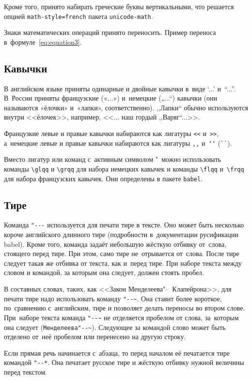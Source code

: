Кроме того, принято набирать греческие буквы вертикальными, что
решается опцией \verb|math-style=french| пакета \verb|unicode-math|.

Знаки математических операций принято переносить. Пример переноса
в~формуле~\eqref{eq:equation3}.

\subsection{Кавычки}
В английском языке приняты одинарные и двойные кавычки в~виде ‘...’ и~“...”.
В~России приняты французские («...») и~немецкие („...“) кавычки (они называются
«ёлочки» и~«лапки», соответственно). ,,Лапки`` обычно используются внутри
<<ёлочек>>, например, <<... наш гордый ,,Варяг``...>>.

Французкие левые и правые кавычки набираются
как лигатуры \verb|<<| и~\verb|>>|, а~немецкие левые
и правые кавычки набираются как лигатуры \verb|,,| и~\verb|‘‘| (\verb|``|).

Вместо лигатур или команд с~активным символом "\ можно использовать команды
\verb|\glqq| и \verb|\grqq| для набора немецких кавычек и команды \verb|\flqq|
и~\verb|\frqq| для набора французских кавычек. Они определены в пакете
\verb|babel|.

\subsection{Тире}
Команда \verb|"---| используется для печати тире в тексте. Оно может быть
несколько короче английского длинного тире (подробности в~документации
русификации babel). Кроме того, команда задаёт небольшую жёсткую отбивку
от~слова, стоящего перед тире. При этом, само тире не~отрывается от~слова.
После тире следует такая же отбивка от текста, как и~перед тире. При наборе
текста между словом и командой, за которым она следует, должен стоять пробел.

В составных словах, таких, как <<Закон Менделеева"--~Клапейрона>>, для печати
тире надо использовать команду \verb|"--~|. Она ставит более короткое,
по~сравнению с~английским, тире и позволяет делать переносы во втором слове.
При~наборе текста команда \verb|"--~| не отделяется пробелом от слова,
за~которым она следует (\verb|Менделеева"--~|). Следующее за командой слово
может быть  отделено от~неё пробелом или перенесено на другую строку.

Если прямая речь начинается с~абзаца, то перед началом её печатается тире
командой \verb|"--*|. Она печатает русское тире и жёсткую отбивку нужной
величины перед текстом.


